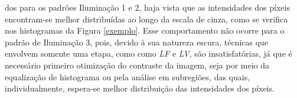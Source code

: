 \documentclass{ceel}
\begin{document}
\begin{multicols}{2}
\begin{minipage}[h]{\columnwidth}
\vspace{-0.1cm}
\caption{Imagens resultantes da Binarização em Sub-regiões para o QR Code 3 nos padrões de (a) Iluminação 1, (c) Iluminação 2 e (e) Iluminação 3, com suas respectivas imagens diferença em (b), (d) e (f).} \label{figS}
\end{minipage}

\vspace{0.4cm}
dos para os padrões Iluminação 1 e 2, haja vista que as intensidades dos píxeis encontram-se melhor distribuídas ao longo da escala de cinza, como se verifica nos histogramas da Figura \ref{exemplo}. Esse comportamento não ocorre para o padrão de Iluminação 3, pois, devido à sua natureza escura, técnicas que envolvem somente uma etapa, como como \emph{LF} e \emph{LV}, são insatisfatórias, já que é necessário primeiro otimização do contraste da imagem, seja por meio da equalização de histograma ou pela análise em subregiões, das quais, individualmente, espera-se melhor distribuição das intensidades dos píxeis.



\end{multicols}
\end{document}
